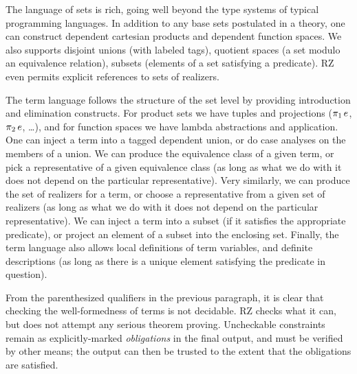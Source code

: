 The language of sets is rich, going well beyond the type systems of typical
programming languages. In addition to any base sets postulated in a theory, one
can construct dependent cartesian products and dependent function spaces. We
also supports disjoint unions (with labeled tags), quotient spaces (a set
modulo an equivalence relation), subsets (elements of a set satisfying a
predicate). RZ even permits explicit references to sets of realizers.

The term language follows the structure of the set level by providing
introduction and elimination constructs. For product sets we have tuples and
projections ($\mathop{\pi_{1}} e$, $\mathop{\pi_{2}} e$, \ldots), and for function spaces we have lambda abstractions and
application. One can inject a term into a tagged dependent union, or do case analyses
on the members of a union. We can produce the equivalence class of a given
term, or pick a representative of a given equivalence class (as long as what we
do with it does not depend on the particular representative). Very similarly,
we can produce the set of realizers for a term, or choose a representative from
a given set of realizers (as long as what we do with it does not depend on the
particular representative). We can inject a term into a subset (if it satisfies
the appropriate predicate), or project an element of a subset into the
enclosing set. Finally, the term language also allows local definitions of term
variables, and definite descriptions (as long as there is a unique element
satisfying the predicate in question).

From the parenthesized qualifiers in the previous paragraph, it is clear that checking the
well-formedness of terms is not decidable. RZ checks what it can, but does not
attempt any serious theorem proving.  Uncheckable constraints remain as
explicitly-marked \emph{obligations} in the final output, and must be verified
by other means; the output can then be trusted to the extent that the obligations are satisfied.



